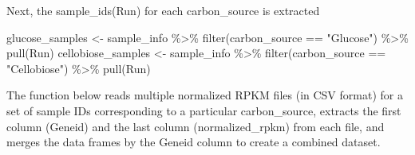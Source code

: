 \documentclass[
  letterpaper,
  DIV=11,
  numbers=noendperiod]{scrartcl}
\newenvironment{Shaded}{\begin{snugshade}}{\end{snugshade}}
\newcommand{\FunctionTok}[1]{\textcolor[rgb]{0.28,0.35,0.67}{#1}}
\newcommand{\NormalTok}[1]{\textcolor[rgb]{0.00,0.23,0.31}{#1}}
\newcommand{\OtherTok}[1]{\textcolor[rgb]{0.00,0.23,0.31}{#1}}
\newcommand{\SpecialCharTok}[1]{\textcolor[rgb]{0.37,0.37,0.37}{#1}}
\newcommand{\StringTok}[1]{\textcolor[rgb]{0.13,0.47,0.30}{#1}}
\begin{document}
Next, the sample\_ids(Run) for each carbon\_source is extracted

\begin{Shaded}
\begin{Highlighting}[]
\NormalTok{glucose\_samples }\OtherTok{\textless{}{-}}\NormalTok{ sample\_info }\SpecialCharTok{\%\textgreater{}\%} 
  \FunctionTok{filter}\NormalTok{(carbon\_source }\SpecialCharTok{==} \StringTok{"Glucose"}\NormalTok{) }\SpecialCharTok{\%\textgreater{}\%} 
  \FunctionTok{pull}\NormalTok{(Run)}
\NormalTok{cellobiose\_samples }\OtherTok{\textless{}{-}}\NormalTok{ sample\_info }\SpecialCharTok{\%\textgreater{}\%} 
  \FunctionTok{filter}\NormalTok{(carbon\_source }\SpecialCharTok{==} \StringTok{"Cellobiose"}\NormalTok{) }\SpecialCharTok{\%\textgreater{}\%} 
  \FunctionTok{pull}\NormalTok{(Run)}
\end{Highlighting}
\end{Shaded}

The function below reads multiple normalized RPKM files (in CSV format)
for a set of sample IDs corresponding to a particular carbon\_source,
extracts the first column (Geneid) and the last column
(normalized\_rpkm) from each file, and merges the data frames by the
Geneid column to create a combined dataset.
\end{document}
